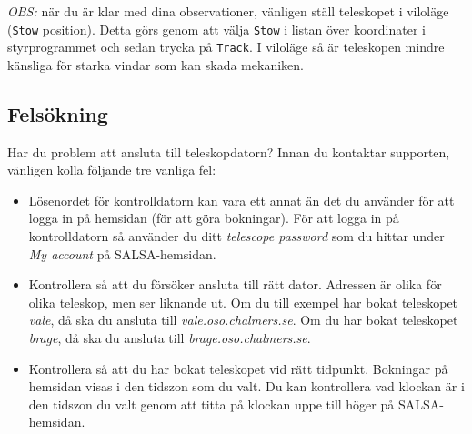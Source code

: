 \emph{OBS:} när du är klar med dina observationer, vänligen ställ teleskopet i
viloläge (\verb!Stow! position). Detta görs genom att välja \verb!Stow! i listan
över koordinater i styrprogrammet och sedan trycka på \verb!Track!. I viloläge
så är teleskopen mindre känsliga för starka vindar som kan skada mekaniken. 

\subsection{Felsökning}
Har du problem att ansluta till teleskopdatorn? Innan du kontaktar supporten,
vänligen kolla följande tre vanliga fel:
\begin{itemize} 
\item Lösenordet för kontrolldatorn kan vara ett annat än det du använder för 
	att logga in på hemsidan (för att göra bokningar). För att logga in på
	kontrolldatorn så använder du ditt \emph{telescope password} som du hittar
	under \emph{My account} på SALSA-hemsidan.
\item Kontrollera så att du försöker ansluta till rätt dator. Adressen är 
	olika för olika teleskop, men ser liknande ut. Om du till exempel
	har bokat teleskopet \emph{vale}, då ska du ansluta till 
	\emph{vale.oso.chalmers.se}. Om du har bokat teleskopet \emph{brage},
	då ska du ansluta till \emph{brage.oso.chalmers.se}. 
\item Kontrollera så att du har bokat teleskopet vid rätt tidpunkt. Bokningar
	på hemsidan visas i den tidszon som du valt. Du kan kontrollera vad klockan
	är i den tidszon du valt genom att titta på klockan uppe till höger på
	SALSA-hemsidan.  
	\end{itemize}

